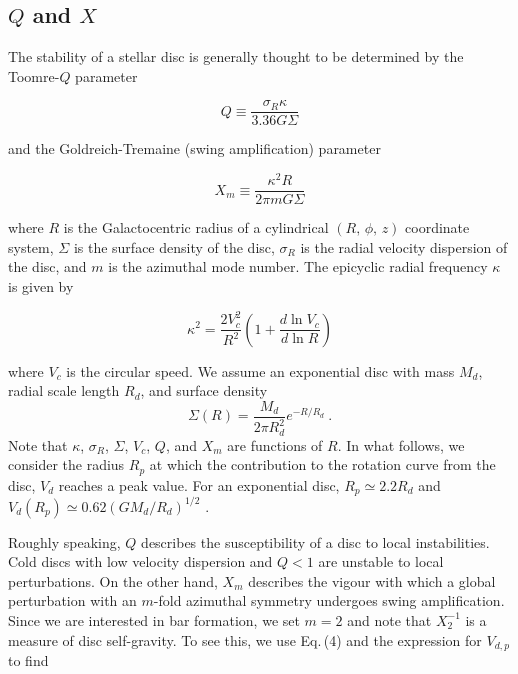 \subsection{$Q$ and $X$} 
The stability of a stellar disc is generally thought to be determined
by the Toomre-$Q$ parameter \citep{ToomreParameter}

\begin{equation} \label{eq:q}
Q \equiv \frac{\sigma_R\kappa}{3.36G\Sigma}
\end{equation}

\noindent and the Goldreich-Tremaine (swing amplification) parameter
\citep{GoldreichTremaine1978, GoldreichTremaine1979}

\begin{equation} \label{eq:xm}
X_m \equiv \frac{\kappa^2 R}{2\pi m G\Sigma}
\end{equation}

\noindent where $R$ is the Galactocentric radius of a cylindrical
$\left (R,\,\phi,\,z\right )$ coordinate system, $\Sigma$ is the
surface density of the disc, $\sigma_R$ is the radial velocity
dispersion of the disc, and $m$ is the azimuthal mode number.  The
epicyclic radial frequency $\kappa$ is given by

\begin{equation} \label{eq:kappa2}
\kappa^2 = \frac{2V_c^2}{R^2}\left (1 + \frac{d\ln{V_c}}{d\ln R}\right )
\end{equation}

\noindent where $V_c$ is the circular speed.  We assume an exponential
disc with mass $M_d$, radial scale length $R_d$, and surface density
\begin{equation} \label{eq:sigma}
\Sigma(R) = \frac{M_d}{2\pi R_d^2} e^{-R/R_d}~.
\end{equation}
\noindent Note that $\kappa$, $\sigma_R$, $\Sigma$, $V_c$, $Q$, and
$X_m$ are functions of $R$.  In what follows, we consider the radius
$R_p$ at which the contribution to the rotation curve from the disc,
$V_d$ reaches a peak value.  For an exponential disc, $R_p \simeq
2.2R_d$ and $V_{d}(R_p) \simeq 0.62 \left (GM_d/R_d\right )^{1/2}$
\citep{BT}.

Roughly speaking, $Q$ describes the susceptibility of a disc to local
instabilities.  Cold discs with low velocity dispersion and $Q<1$ are
unstable to local perturbations.  On the other hand, $X_m$ describes
the vigour with which a global perturbation with an $m$-fold azimuthal
symmetry undergoes swing amplification.  Since we are interested in
bar formation, we set $m=2$ and note that $X_2^{-1}$ is a measure of
disc self-gravity.  To see this, we use Eq.\,(4) and the expression
for $V_{d,p}$ to find

